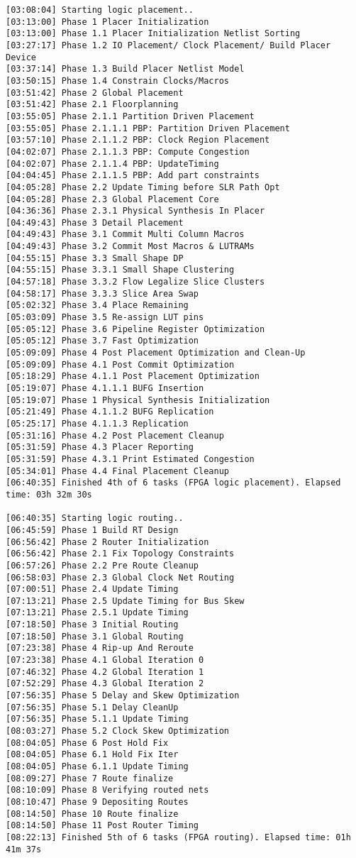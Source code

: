 \begin{lstlisting}[label=lst:code_2,caption=Содержимое файла  v++*.log]
[03:08:04] Starting logic placement..
[03:13:00] Phase 1 Placer Initialization
[03:13:00] Phase 1.1 Placer Initialization Netlist Sorting
[03:27:17] Phase 1.2 IO Placement/ Clock Placement/ Build Placer Device
[03:37:14] Phase 1.3 Build Placer Netlist Model
[03:50:15] Phase 1.4 Constrain Clocks/Macros
[03:51:42] Phase 2 Global Placement
[03:51:42] Phase 2.1 Floorplanning
[03:55:05] Phase 2.1.1 Partition Driven Placement
[03:55:05] Phase 2.1.1.1 PBP: Partition Driven Placement
[03:57:10] Phase 2.1.1.2 PBP: Clock Region Placement
[04:02:07] Phase 2.1.1.3 PBP: Compute Congestion
[04:02:07] Phase 2.1.1.4 PBP: UpdateTiming
[04:04:45] Phase 2.1.1.5 PBP: Add part constraints
[04:05:28] Phase 2.2 Update Timing before SLR Path Opt
[04:05:28] Phase 2.3 Global Placement Core
[04:36:36] Phase 2.3.1 Physical Synthesis In Placer
[04:49:43] Phase 3 Detail Placement
[04:49:43] Phase 3.1 Commit Multi Column Macros
[04:49:43] Phase 3.2 Commit Most Macros & LUTRAMs
[04:55:15] Phase 3.3 Small Shape DP
[04:55:15] Phase 3.3.1 Small Shape Clustering
[04:57:18] Phase 3.3.2 Flow Legalize Slice Clusters
[04:58:17] Phase 3.3.3 Slice Area Swap
[05:02:32] Phase 3.4 Place Remaining
[05:03:09] Phase 3.5 Re-assign LUT pins
[05:05:12] Phase 3.6 Pipeline Register Optimization
[05:05:12] Phase 3.7 Fast Optimization
[05:09:09] Phase 4 Post Placement Optimization and Clean-Up
[05:09:09] Phase 4.1 Post Commit Optimization
[05:18:29] Phase 4.1.1 Post Placement Optimization
[05:19:07] Phase 4.1.1.1 BUFG Insertion
[05:19:07] Phase 1 Physical Synthesis Initialization
[05:21:49] Phase 4.1.1.2 BUFG Replication
[05:25:17] Phase 4.1.1.3 Replication
[05:31:16] Phase 4.2 Post Placement Cleanup
[05:31:59] Phase 4.3 Placer Reporting
[05:31:59] Phase 4.3.1 Print Estimated Congestion
[05:34:01] Phase 4.4 Final Placement Cleanup
[06:40:35] Finished 4th of 6 tasks (FPGA logic placement). Elapsed time: 03h 32m 30s 

[06:40:35] Starting logic routing..
[06:45:59] Phase 1 Build RT Design
[06:56:42] Phase 2 Router Initialization
[06:56:42] Phase 2.1 Fix Topology Constraints
[06:57:26] Phase 2.2 Pre Route Cleanup
[06:58:03] Phase 2.3 Global Clock Net Routing
[07:00:51] Phase 2.4 Update Timing
[07:13:21] Phase 2.5 Update Timing for Bus Skew
[07:13:21] Phase 2.5.1 Update Timing
[07:18:50] Phase 3 Initial Routing
[07:18:50] Phase 3.1 Global Routing
[07:23:38] Phase 4 Rip-up And Reroute
[07:23:38] Phase 4.1 Global Iteration 0
[07:46:32] Phase 4.2 Global Iteration 1
[07:52:29] Phase 4.3 Global Iteration 2
[07:56:35] Phase 5 Delay and Skew Optimization
[07:56:35] Phase 5.1 Delay CleanUp
[07:56:35] Phase 5.1.1 Update Timing
[08:03:27] Phase 5.2 Clock Skew Optimization
[08:04:05] Phase 6 Post Hold Fix
[08:04:05] Phase 6.1 Hold Fix Iter
[08:04:05] Phase 6.1.1 Update Timing
[08:09:27] Phase 7 Route finalize
[08:10:09] Phase 8 Verifying routed nets
[08:10:47] Phase 9 Depositing Routes
[08:14:50] Phase 10 Route finalize
[08:14:50] Phase 11 Post Router Timing
[08:22:13] Finished 5th of 6 tasks (FPGA routing). Elapsed time: 01h 41m 37s 


\end{lstlisting}
